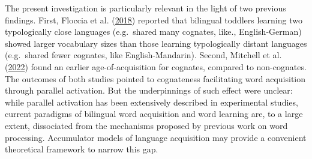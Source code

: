 \documentclass[
]{article}
\begin{document}
The present investigation is particularly relevant in the light of two
previous findings. First, Floccia et al.
(\protect\hyperlink{ref-floccia2018introduction}{2018}) reported that
bilingual toddlers learning two typologically close languages
(e.g.~shared many cognates, like., English-German) showed larger
vocabulary sizes than those learning typologically distant languages
(e.g.~shared fewer cognates, like English-Mandarin). Second, Mitchell et
al. (\protect\hyperlink{ref-mitchell2022cognates}{2022}) found an
earlier age-of-acquisition for cognates, compared to non-cognates. The
outcomes of both studies pointed to cognateness facilitating word
acquisition through parallel activation. But the underpinnings of such
effect were unclear: while parallel activation has been extensively
described in experimental studies, current paradigms of bilingual word
acquisition and word learning are, to a large extent, dissociated from
the mechanisms proposed by previous work on word processing. Accumulator
models of language acquisition may provide a convenient theoretical
framework to narrow this gap.
\end{document}
